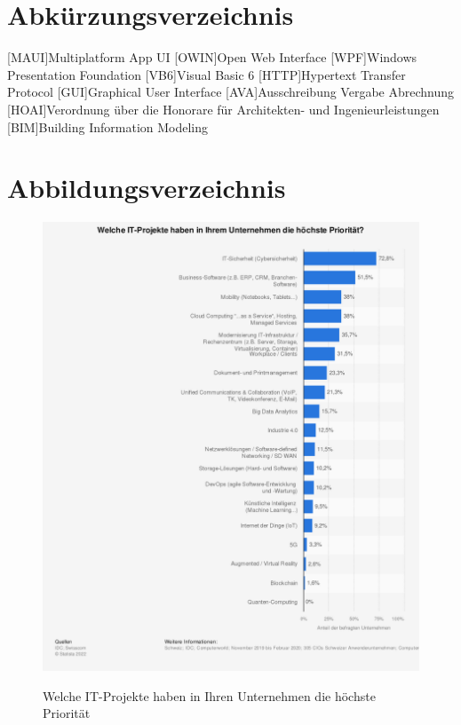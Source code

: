 \chapter{Abkürzungsverzeichnis}

\begin{acronym}
	[MAUI]{Multiplatform App UI}
	[OWIN]{Open Web Interface}
	[WPF]{Windows Presentation Foundation}
	[VB6]{Visual Basic 6}
	[HTTP]{Hypertext Transfer Protocol}
	[GUI]{Graphical User Interface}
	[AVA]{Ausschreibung Vergabe Abrechnung}
	[HOAI]{Verordnung über die Honorare für Architekten- und Ingenieurleistungen}
	[BIM]{Building Information Modeling}
\end{acronym}

\clearpage

\chapter{Abbildungsverzeichnis}


\begin{figure}[b!]
	{\caption{Welche IT-Projekte haben in Ihren Unternehmen die höchste Priorität}
		\label{FIG:statistic-it-projects}}
	{\includegraphics[width=1\textwidth]{figures/statistic-it-projekte.png}}
\end{figure}

